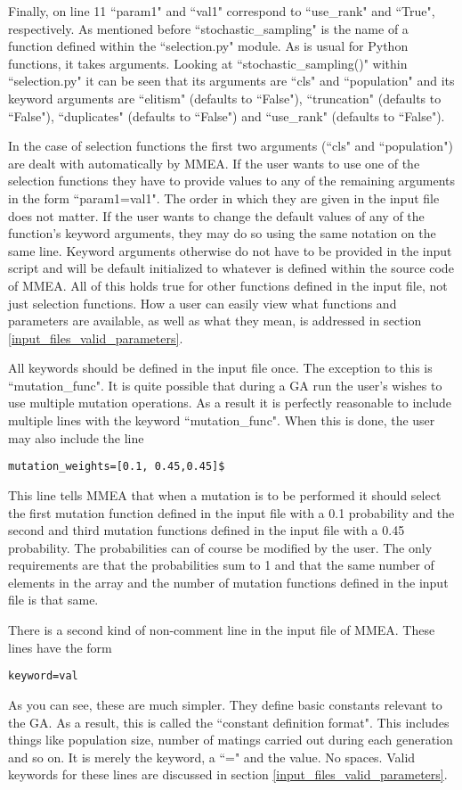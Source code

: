 \documentclass{article}
\begin{document}
Finally, on line 11 ``param1" and ``val1" correspond to ``use\_rank" and ``True", respectively. As mentioned before ``stochastic\_sampling" is the name of a function defined within the ``selection.py" module. As is usual for Python functions, it takes arguments. Looking at ``stochastic\_sampling()" within ``selection.py" it can be seen that its arguments are ``cls" and ``population" and its keyword arguments are ``elitism" (defaults to ``False"), ``truncation" (defaults to ``False"), ``duplicates" (defaults to ``False") and ``use\_rank" (defaults to ``False").

In the case of selection functions the first two arguments (``cls" and ``population") are dealt with automatically by MMEA. If the user wants to use one of the selection functions they have to provide values to any of the remaining arguments in the form ``param1=val1". The order in which they are given in the input file does not matter. If the user wants to change the default values of any of the function's keyword arguments, they may do so using the same notation on the same line. Keyword arguments otherwise do not have to be provided in the input script and will be default initialized to whatever is defined within the source code of MMEA. All of this holds true for other functions defined in the input file, not just selection functions. How a user can easily view what functions and parameters are available, as well as what they mean, is addressed in section \ref{input_files_valid_parameters}.

All keywords should be defined in the input file once. The exception to this is ``mutation\_func". It is quite possible that during a GA run the user's wishes to use multiple mutation operations. As a result it is perfectly reasonable to include multiple lines with the keyword  ``mutation\_func". When this is done, the user may also include the line 
\begin{verbatim}
mutation_weights=[0.1, 0.45,0.45]$
\end{verbatim}
This line tells MMEA that when a mutation is to be performed it should select the first mutation function defined in the input file with a 0.1 probability and the second and third mutation functions defined in the input file with a 0.45 probability. The probabilities can of course be modified by the user. The only requirements are that the probabilities sum to 1 and that the same number of elements in the array and the number of mutation functions defined in the input file is that same.

There is a second kind of non-comment line in the input file of MMEA. These lines have the form
\begin{verbatim}
keyword=val
\end{verbatim}
As you can see, these are much simpler. They define basic constants relevant to the GA. As a result, this is called the ``constant definition format". This includes things like population size, number of matings carried out during each generation and so on. It is merely the keyword, a ``=" and the value. No spaces. Valid keywords for these lines are discussed in section \ref{input_files_valid_parameters}.
\end{document}
